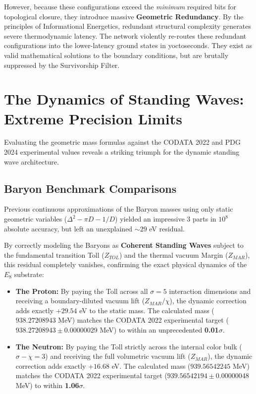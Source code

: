 However, because these configurations exceed the \textit{minimum} required bits for topological closure, they introduce massive \textbf{Geometric Redundancy}. By the principles of Informational Energetics, redundant structural complexity generates severe thermodynamic latency. The network violently re-routes these redundant configurations into the lower-latency ground states in yoctoseconds. They exist as valid mathematical solutions to the boundary conditions, but are brutally suppressed by the Survivorship Filter.


\section{The Dynamics of Standing Waves: Extreme Precision Limits}

Evaluating the geometric mass formulas against the CODATA 2022 and PDG 2024 experimental values reveals a striking triumph for the dynamic standing wave architecture. 

\subsection{Baryon Benchmark Comparisons}
Previous continuous approximations of the Baryon masses using only static geometric variables ($\Delta^2 - \pi D - 1/D$) yielded an impressive $3$ parts in $10^8$ absolute accuracy, but left an unexplained $\sim 29$ eV residual. 

By correctly modeling the Baryons as \textbf{Coherent Standing Waves} subject to the fundamental transition Toll ($Z_{TOL}$) and the thermal vacuum Margin ($Z_{MAR}$), this residual completely vanishes, confirming the exact physical dynamics of the $E_8$ substrate:

\begin{itemize}
    \item \textbf{The Proton:} By paying the Toll across all $\sigma=5$ interaction dimensions and receiving a boundary-diluted vacuum lift ($Z_{MAR}/\chi$), the dynamic correction adds exactly $+29.54$ eV to the static mass. The calculated mass ($938.27208943$ MeV) matches the CODATA 2022 experimental target ($938.27208943 \pm 0.00000029$ MeV) to within an unprecedented \textbf{0.01$\sigma$}.
    
    \item \textbf{The Neutron:} By paying the Toll strictly across the internal color bulk ($\sigma-\chi=3$) and receiving the full volumetric vacuum lift ($Z_{MAR}$), the dynamic correction adds exactly $+16.68$ eV. The calculated mass ($939.56542245$ MeV) matches the CODATA 2022 experimental target ($939.56542194 \pm 0.00000048$ MeV) to within \textbf{1.06$\sigma$}.
\end{itemize}


